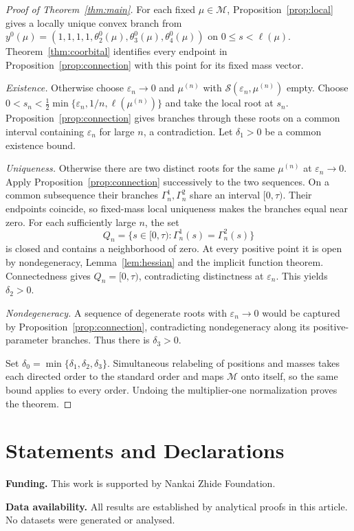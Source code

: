 \documentclass[11pt,a4paper]{article}
\numberwithin{equation}{section}
\theoremstyle{remark}
\newcommand{\M}{\mathcal M}
\newcommand{\eps}{\varepsilon}
\begin{document}
\begin{proof}[Proof of Theorem~\ref{thm:main}]
For each fixed $\mu\in\M$, Proposition~\ref{prop:local} gives a locally unique convex branch from
$y^0(\mu)=(1,1,1,1,\theta_2^0(\mu),\theta_3^0(\mu),\theta_4^0(\mu))$ on $0\le s<\ell(\mu)$.
Theorem~\ref{thm:coorbital} identifies every endpoint in Proposition~\ref{prop:connection} with this point for its fixed mass vector.

\emph{Existence.}
Otherwise choose $\eps_n\to0$ and $\mu^{(n)}$ with $\mathcal S(\eps_n,\mu^{(n)})$ empty.
Choose $0<s_n<\frac12\min\{\eps_n,1/n,\ell(\mu^{(n)})\}$ and take the local root at $s_n$.
Proposition~\ref{prop:connection} gives branches through these roots on a common interval containing $\eps_n$ for large $n$, a contradiction. Let $\delta_1>0$ be a common existence bound.

\emph{Uniqueness.}
Otherwise there are two distinct roots for the same $\mu^{(n)}$ at $\eps_n\to0$.
Apply Proposition~\ref{prop:connection} successively to the two sequences. On a common subsequence their branches $\Gamma_n^1,\Gamma_n^2$ share an interval $[0,\tau)$.
Their endpoints coincide, so fixed-mass local uniqueness makes the branches equal near zero.
For each sufficiently large $n$, the set
\[
 Q_n=\{s\in[0,\tau):\Gamma_n^1(s)=\Gamma_n^2(s)\}
\]
is closed and contains a neighborhood of zero. At every positive point it is open by nondegeneracy, Lemma~\ref{lem:hessian} and the implicit function theorem.
Connectedness gives $Q_n=[0,\tau)$, contradicting distinctness at $\eps_n$. This yields $\delta_2>0$.

\emph{Nondegeneracy.}
A sequence of degenerate roots with $\eps_n\to0$ would be captured by Proposition~\ref{prop:connection}, contradicting nondegeneracy along its positive-parameter branches. Thus there is $\delta_3>0$.

Set $\delta_0=\min\{\delta_1,\delta_2,\delta_3\}$.
Simultaneous relabeling of positions and masses takes each directed order to the standard order and maps $\M$ onto itself, so the same bound applies to every order.
Undoing the multiplier-one normalization proves the theorem.
\end{proof}


\section*{Statements and Declarations}
\noindent\textbf{Funding.} This work is supported by Nankai Zhide Foundation.

\smallskip
\noindent\textbf{Data availability.} All results are established by analytical proofs in this article. No datasets were generated or analysed.
\end{document}
